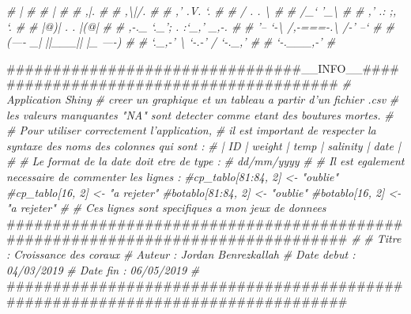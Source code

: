\documentclass[]{report}
\newenvironment{Shaded}{\begin{snugshade}}{\end{snugshade}}
\newcommand{\CommentTok}[1]{\textcolor[rgb]{0.56,0.35,0.01}{\textit{#1}}}
\newcommand{\NormalTok}[1]{#1}
\begin{document}
\begin{Shaded}
\begin{Highlighting}[]
\CommentTok{#                 |                                                            #}
\CommentTok{#                 |                                                            #}
\CommentTok{#                ,|.                                                           #}
\CommentTok{#               ,\textbackslash{}|/.                                                          #}
\CommentTok{#             ,' .V. `.                                                        #}
\CommentTok{#            / .     . \textbackslash{}                                                       #}
\CommentTok{#           /_`       '_\textbackslash{}                                                      #}
\CommentTok{#          ,' .:     ;, `.                                                     #}
\CommentTok{#          |@)|  . .  |(@|                                                     #}
\CommentTok{#     ,-._ `._';  .  :`_,' _,-.                                                #}
\CommentTok{#    '--  `-\textbackslash{} /,-===-.\textbackslash{} /-'  --`                                               #}
\CommentTok{#   (----  _|  ||___||  |_  ----)                                              #}
\CommentTok{#    `._,-'  \textbackslash{}  `-.-'  /  `-._,'                                               #}
\CommentTok{#             `-.___,-'                                                        #}

\NormalTok{################################__INFO__########################################}
\CommentTok{# Application Shiny}
\CommentTok{# creer un graphique et un tableau a partir d'un fichier .csv}
\CommentTok{# les valeurs manquantes "NA" sont detecter comme etant des boutures mortes.}
\CommentTok{#}
\CommentTok{# Pour utiliser correctement l'application,}
\CommentTok{# il est important de respecter la syntaxe des noms des colonnes qui sont :}
\CommentTok{# |     ID     |     weight     |     temp     |    salinity    |     date     |}
\CommentTok{#}
\CommentTok{# Le format de la date doit etre de type :}
\CommentTok{# dd/mm/yyyy}
\CommentTok{#}
\CommentTok{# Il est egalement necessaire de commenter les lignes :}
\CommentTok{#cp_tablo[81:84, 2] <- "oublie"}
\CommentTok{#cp_tablo[16, 2] <- "a rejeter"}
\CommentTok{#botablo[81:84, 2] <- "oublie"}
\CommentTok{#botablo[16, 2] <- "a rejeter"}
\CommentTok{#}
\CommentTok{# Ces lignes sont specifiques a mon jeux de donnees}
\NormalTok{################################################################################}
\CommentTok{#}
\CommentTok{# Titre  : Croissance des coraux}
\CommentTok{# Auteur : Jordan Benrezkallah}
\CommentTok{# Date debut : 04/03/2019}
\CommentTok{# Date fin : 06/05/2019}
\CommentTok{#}
\NormalTok{################################################################################}


\end{Highlighting}
\end{Shaded}
\end{document}
